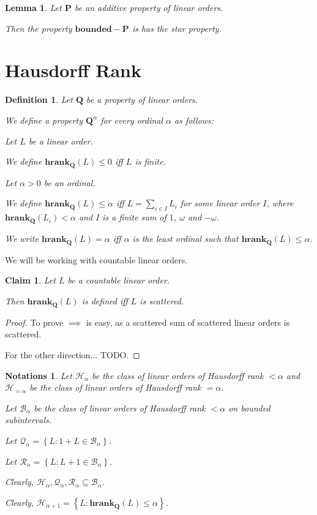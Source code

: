 \documentclass{article}
\newtheorem{lemma}{Lemma}
\newtheorem{claim}{Claim}
\newtheorem{definition}{Definition}
\newtheorem{notations}{Notations}
\newcommand{\braces}[1]{\left\{ {#1} \right\}}
\newcommand{\setcomp}[1]{\braces{#1}}
\newcommand{\hrank}[1]{\mathbf{hrank}_{\qq}\left( #1 \right)}
\newcommand{\agemo}{-\omega}
\newcommand{\bounded}{\mathbf{bounded}}
\newcommand{\pp}{\mathbf{P}}
\newcommand{\qq}{\mathbf{Q}}
\begin{document}
\begin{lemma}
  Let $\pp$ be an additive property of linear orders.

  Then the property $\bounded-\pp$ is has the star property.
\end{lemma}

\section{Hausdorff Rank}

\begin{definition}
  Let $\qq$ be a property of linear orders.

  We define a property $\qq^\alpha$ for every ordinal $\alpha$ as follows:

  Let $L$ be a linear order.

  We define $\hrank{L} \le 0$ iff $L$ is finite.

  Let $\alpha > 0$ be an ordinal.

  We define $\hrank{L} \le \alpha$
  iff $L = \sum_{i \in I} L_i$ for some linear order $I$,
  where $\hrank{L_i} < \alpha$ and $I$ is a finite sum of $1$, $\omega$ and
  $\agemo$.

  We write $\hrank{L} = \alpha$ iff $\alpha$ is the
  least ordinal such that $\hrank{L} \le \alpha$.
\end{definition}

We will be working with countable linear orders.

\begin{claim}
  Let $L$ be a countable linear order.

  Then $\hrank{L}$ is defined iff $L$ is scattered.
\end{claim}

\begin{proof}
  To prove $\implies$ is easy, as a scattered sum of scattered linear orders is scattered.

  For the other direction... TODO.
\end{proof}

\begin{notations}
  Let $\mathcal{H}_{\alpha}$ be the class of linear orders of Hausdorff rank
  $< \alpha$ and $\mathcal{H}_{=\alpha}$ be the class of linear orders of
  Hausdorff rank $= \alpha$.

  Let $\mathcal{B}_{\alpha}$ be the class of linear orders
  of Hausdorff rank $< \alpha$ on bounded subintervals.

  Let $\mathcal{Q}_{\alpha} = \setcomp{L : 1 + L \in \mathcal{B}_{\alpha}}$.

  Let $\mathcal{R}_{\alpha} = \setcomp{L : L + 1 \in \mathcal{B}_{\alpha}}$.

  Clearly,
  $\mathcal{H}_{\alpha}, \mathcal{Q}_{\alpha}, \mathcal{R}_{\alpha} \subseteq \mathcal{B}_{\alpha}$.

  Clearly,
  $\mathcal{H}_{\alpha + 1} = \setcomp{L : \hrank{L} \le \alpha}$.
\end{notations}
\end{document}
